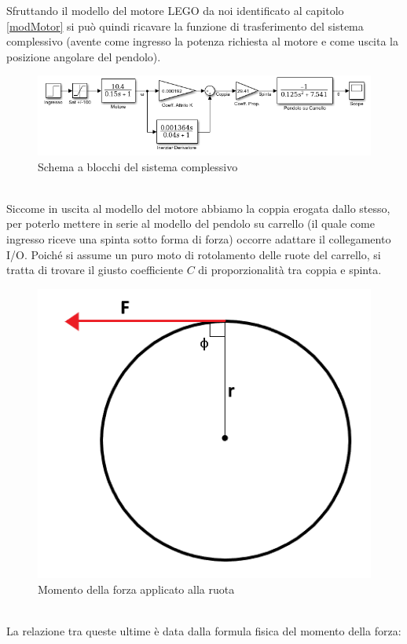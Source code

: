 Sfruttando il modello del motore LEGO da noi identificato al capitolo \ref{modMotor} si può quindi ricavare la funzione di trasferimento del sistema complessivo (avente come ingresso la potenza richiesta al motore e come uscita la posizione angolare del pendolo).\begin{figure}[ht]
	\centering
	\includegraphics[width=\textwidth]{SisComplessivoPendoloNormale.PNG}
	\caption{Schema a blocchi del sistema complessivo}
	\label{SisComplessivoPendoloNormale}
\end{figure}
\\Siccome in uscita al modello del motore abbiamo la coppia erogata dallo stesso, per poterlo mettere in serie al modello del pendolo su carrello (il quale come ingresso riceve una spinta sotto forma di forza) occorre adattare il collegamento I/O. Poiché si assume un puro moto di rotolamento delle ruote del carrello, si tratta di trovare il giusto coefficiente $C$ di proporzionalità tra coppia e spinta.
\begin{figure}[ht]
	\centering
	\includegraphics[scale=0.55]{braccioForza.PNG}
	\caption{Momento della forza applicato alla ruota}
	\label{braccioForza}
\end{figure}
\\La relazione tra queste ultime è data dalla formula fisica del momento della forza:
